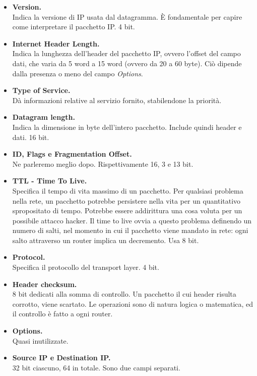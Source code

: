 \begin{itemize}
	\item \textbf{Version.}\\
	Indica la versione di IP usata dal datagramma. È fondamentale per capire come interpretare il pacchetto IP. 4 bit. 
	\item \textbf{Internet Header Length.}\\
	Indica la lunghezza dell'header del pacchetto IP, ovvero l'offset del campo dati, che varia da 5 word a 15 word (ovvero da 20 a 60 byte). Ciò dipende dalla presenza o meno del campo \textit{Options}.
	\item \textbf{Type of Service.}\\
	Dà informazioni relative al servizio fornito, stabilendone la priorità.
	
	\item \textbf{Datagram length.}\\
	Indica la dimensione in byte dell'intero pacchetto. Include quindi header e dati. 16 bit.
	
	\item \textbf{ID, Flags e Fragmentation Offset.}\\
	Ne parleremo meglio dopo. Rispettivamente 16, 3 e 13 bit.
	
	\item \textbf{TTL - Time To Live.}\\
	Specifica il tempo di vita massimo di un pacchetto. Per qualsiasi problema nella rete, un pacchetto potrebbe persistere nella vita per un quantitativo spropositato di tempo. Potrebbe essere addirittura una cosa voluta per un possibile attacco hacker. Il time to live ovvia a questo problema definendo un numero di salti, nel momento in cui il pacchetto viene mandato in rete: ogni salto attraverso un router implica un decremento. Usa 8 bit.
	
	\item \textbf{Protocol.}\\
	Specifica il protocollo del transport layer. 4 bit.
	
	\item \textbf{Header checksum.}\\
	8 bit dedicati alla somma di controllo. Un pacchetto il cui header risulta corrotto, viene scartato. Le operazioni sono di natura logica o matematica, ed il controllo è fatto a ogni router.
	
	\item \textbf{Options.}\\
	Quasi inutilizzate.
	
	\item \textbf{Source IP e Destination IP.}\\
	32 bit ciascuno, 64 in totale. Sono due campi separati.
\end{itemize}

